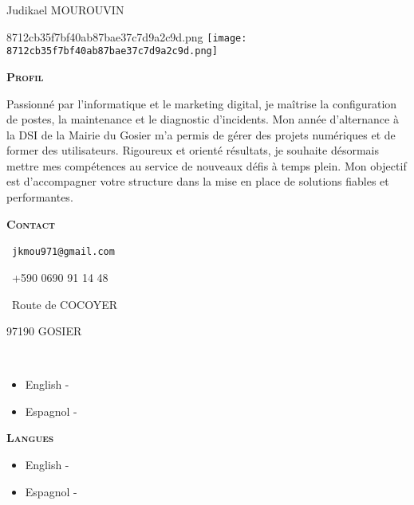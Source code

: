\documentclass[11pt,a4paper]{article}
\newcommand{\headleft}[1]{\vspace*{3ex}\textsc{\textbf{#1}}\par%
  \vspace*{-1.5ex}\hrulefill\par\vspace*{0.7ex}}
\begin{document}
\thispagestyle{empty}
\setlength{\topskip}{0pt}\setlength{\parindent}{0pt}\setlength{\parskip}{0pt}
\raggedbottom

\begin{minipage}[t]{0.33\textwidth}
  \colorbox{cvblue}{\begin{minipage}[t][5mm][t]{\textwidth}\null\end{minipage}}
  \vspace{-.2ex}
  \colorbox{cvblue!90}{%
    \color{white}\textwidth
    \begin{minipage}[t][293mm][t]{0.82\textwidth}\raggedright
      \vspace*{2.5ex}
      \Large Judikael MOUROUVIN\normalsize

      \ifx\relax8712cb35f7bf40ab87bae37c7d9a2c9d.png\relax\else
        \vspace{2ex}\null\hfill
        \texttt{[image: 8712cb35f7bf40ab87bae37c7d9a2c9d.png]}
        \hfill\null
      \fi

      \headleft{Profil}
      Passionné par l’informatique et le marketing digital, je maîtrise la configuration de postes, la maintenance et le diagnostic d’incidents. Mon année d’alternance à la DSI de la Mairie du Gosier m’a permis de gérer des projets numériques et de former des utilisateurs. Rigoureux et orienté résultats, je souhaite désormais mettre mes compétences au service de nouveaux défis à temps plein. Mon objectif est d’accompagner votre structure dans la mise en place de solutions fiables et performantes.

      \headleft{Contact}\small
      \MVAt\  \texttt{jkmou971@gmail.com}\par
      \Mobilefone\ +590 0690 91 14 48\par
      \Letter\ Route de COCOYER\par
      97190 GOSIER\par
      \faLinkedin\  \href{}{}
      \normalsize

      \ifx\relax\begin{itemize}[leftmargin=*]
\item English - \textcolor{gray}{}
\item Espagnol - \textcolor{gray}{}\end{itemize}\relax\else
        \headleft{Langues}
        \begin{itemize}[leftmargin=*]
\item English - \textcolor{gray}{}
\item Espagnol - \textcolor{gray}{}\end{itemize}
      \fi


\end{minipage}}
\end{minipage}
\end{document}
